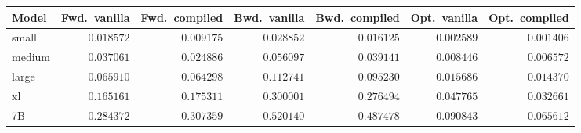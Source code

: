 \begin{tabular}{lrrrrrr}
\toprule
Model & Fwd.\ vanilla & Fwd.\ compiled & Bwd.\ vanilla & Bwd.\ compiled & Opt.\ vanilla & Opt.\ compiled \\
\midrule
small & $0.018572$ & $0.009175$ & $0.028852$ & $0.016125$ & $0.002589$ & $0.001406$ \\
medium & $0.037061$ & $0.024886$ & $0.056097$ & $0.039141$ & $0.008446$ & $0.006572$ \\
large & $0.065910$ & $0.064298$ & $0.112741$ & $0.095230$ & $0.015686$ & $0.014370$ \\
xl & $0.165161$ & $0.175311$ & $0.300001$ & $0.276494$ & $0.047765$ & $0.032661$ \\
7B & $0.284372$ & $0.307359$ & $0.520140$ & $0.487478$ & $0.090843$ & $0.065612$ \\
\bottomrule
\end{tabular}
